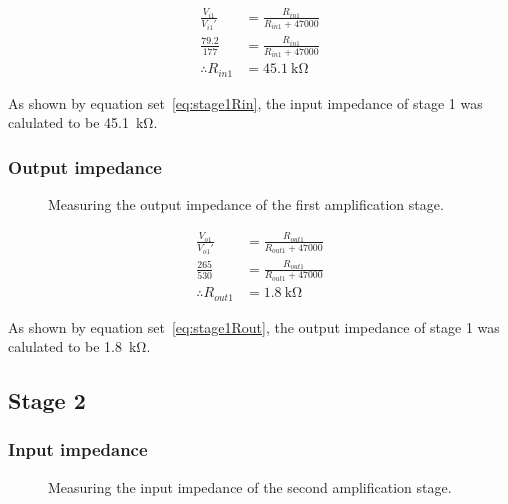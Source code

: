 \documentclass[a4paper,11pt]{article}
\begin{document}
            \begin{subequations} \label{eq:stage1Rin}
            \begin{align}
                \frac{V_{i1}}{V_{i1}'} &= \frac{R_{in1}}{R_{in1} + 47000}   \\
                \frac{79.2}{177} &= \frac{R_{in1}}{R_{in1} + 47000}   \\
                \therefore R_{in1} &= \SI{45.1}{\kilo\ohm}
            \end{align}
            \end{subequations}
            
            As shown by equation set~\ref{eq:stage1Rin}, the input impedance of stage 1 was calulated to be \SI{45.1}{\kilo\ohm}.
        
        \subsubsection{Output impedance}
        
            \begin{figure}[h]
            \centering
                
                \caption{Measuring the output impedance of the first amplification stage.}
                \label{fig:stage1outputZ}
            \end{figure}
            
            \begin{subequations} \label{eq:stage1Rout}
            \begin{align}
                \frac{V_{o1}}{V_{o1}'} &= \frac{R_{out1}}{R_{out1} + 47000}   \\
                \frac{265}{530} &= \frac{R_{out1}}{R_{out1} + 47000}   \\
                \therefore R_{out1} &= \SI{1.8}{\kilo\ohm}
            \end{align}
            \end{subequations}
            
            As shown by equation set~\ref{eq:stage1Rout}, the output impedance of stage 1 was calulated to be \SI{1.8}{\kilo\ohm}.
        
    \subsection{Stage 2}
        \subsubsection{Input impedance}
            \begin{figure}[h]
            \centering
                
                \caption{Measuring the input impedance of the second amplification stage.}
                \label{fig:stage2inputZ}
            \end{figure}
            
\end{document}
